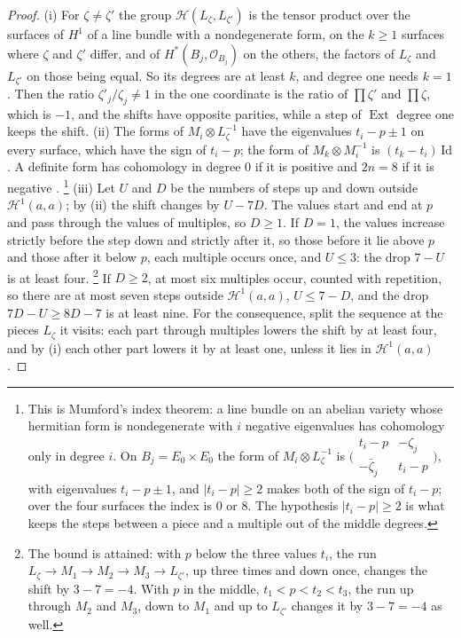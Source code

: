 \documentclass[11pt,reqno]{amsart}
\theoremstyle{plain}
\theoremstyle{definition}
\theoremstyle{remark}
\newcommand{\cO}{\mathcal{O}}
\newcommand{\cH}{\mathcal{H}}
\DeclareMathOperator{\Ext}{Ext}
\begin{document}
\begin{proof}
(i) For $\zeta\ne\zeta'$ the group $\cH(L_{\zeta},L_{\zeta'})$ is the tensor
product over the surfaces of $H^{1}$ of a line bundle with a nondegenerate
form, on the $k\ge1$ surfaces where $\zeta$ and $\zeta'$ differ, and of
$H^{*}(B_{j},\cO_{B_{j}})$ on the others, the factors of $L_{\zeta}$ and
$L_{\zeta'}$ on those being equal. So its degrees are at least $k$, and degree
one needs $k=1$. Then the ratio $\zeta'_{j}/\zeta_{j}\ne1$ in the one
coordinate is the ratio of $\prod\zeta'$ and $\prod\zeta$, which is $-1$, and
the shifts have opposite parities, while a step of $\Ext$ degree one keeps
the shift. (ii) The forms of $M_{i}\otimes L_{\zeta}^{-1}$ have the
eigenvalues $t_{i}-p\pm1$ on every surface, which have the sign of $t_{i}-p$;
the form of $M_{k}\otimes M_{i}^{-1}$ is $(t_{k}-t_{i})\,\mathrm{Id}$. A
definite form has cohomology in degree $0$ if it is positive and $2n=8$ if
it is negative \cite[Chapter~3]{BL04}.%
\footnote{This is Mumford's index theorem: a line bundle on an abelian
variety whose hermitian form is nondegenerate with $i$ negative eigenvalues
has cohomology only in degree $i$. On $B_{j}=E_{0}\times E_{0}$ the form of
$M_{i}\otimes L_{\zeta}^{-1}$ is
$\bigl(\begin{smallmatrix}t_{i}-p&-\zeta_{j}\\-\bar\zeta_{j}&t_{i}-p\end{smallmatrix}\bigr)$,
with eigenvalues $t_{i}-p\pm1$, and $|t_{i}-p|\ge2$ makes both of the sign of
$t_{i}-p$; over the four surfaces the index is $0$ or $8$. The hypothesis
$|t_{i}-p|\ge2$ is what keeps the steps between a piece and a multiple out
of the middle degrees.}
(iii) Let $U$ and $D$ be the numbers of steps up and down outside
$\cH^{1}(a,a)$; by (ii) the shift changes by $U-7D$. The values start and
end at $p$ and pass through the values of multiples, so $D\ge1$. If $D=1$,
the values increase strictly before the step down and strictly after it, so
those before it lie above $p$ and those after it below $p$, each multiple
occurs once, and $U\le3$: the drop $7-U$ is at least four.%
\footnote{The bound is attained: with $p$ below the three values $t_{i}$, the
run $L_{\zeta}\to M_{1}\to M_{2}\to M_{3}\to L_{\zeta'}$, up three times and
down once, changes the shift by $3-7=-4$. With $p$ in the middle,
$t_{1}<p<t_{2}<t_{3}$, the run up through $M_{2}$ and $M_{3}$, down to $M_{1}$
and up to $L_{\zeta'}$ changes it by $3-7=-4$ as well.} If $D\ge2$, at most
six multiples occur, counted with repetition, so there are at most seven
steps outside $\cH^{1}(a,a)$, $U\le7-D$, and the drop $7D-U\ge8D-7$ is at
least nine. For the consequence, split the sequence at the pieces
$L_{\zeta}$ it visits: each part through multiples lowers the shift by at
least four, and by (i) each other part lowers it by at least one, unless it
lies in $\cH^{1}(a,a)$.
\end{proof}
\end{document}

